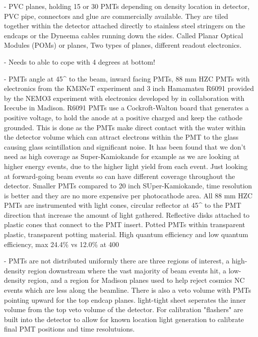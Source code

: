 - PVC planes, holding 15 or 30 PMTs depending on density location in detector, PVC pipe,
connectors and glue are commercially available. They are tiled together within the detector
attached directly to stainless steel stringers on the endcaps or the Dyneema cables running down
the sides. Called Planar Optical Modules (POMs) or planes, Two types of planes, different readout
electronics.

- Needs to able to cope with 4 degrees at bottom!

- PMTs angle at \unit{45}{^\circ} to the beam, inward facing PMTs, 88 mm HZC PMTs with electronics
from the KM3NeT experiment and 3 inch Hamamatsu R6091 provided by the NEMO3 experiment with
electronics developed by \chips in collaboration with Icecube in Madison. R6091 PMTs use a
Cockroft-Walton board that generates a positive voltage, to hold the anode at a positive charged
and keep the cathode grounded. This is done as the PMTs make direct contact with the water within
the detector volume which can attract electrons within the PMT to the glass causing glass
scintillation and significant noise. It has been found that we don't need as high coverage as
Super-Kamiokande for example as we are looking at higher energy events, due to the higher light
yield from each event. Just looking at forward-going beam events so can have different coverage
throughout the detector. Smaller PMTs compared to 20 inch SUper-Kamiokande, time resolution is
better and they are no more expensive per photocathode area. All 88 mm HZC PMTs are instrumented
with light cones, circular reflector at \unit{45}{^\circ} to the PMT direction that increase the
amount of light gathered. Reflective disks attached to plastic cones that connect to the PMT
insert. Potted PMTs within transparent plastic, transparent potting material. High quantum
efficiency and low quantum efficiency, max 24.4\% vs 12.0\% at \unit{400}{}

- PMTs are not distributed uniformly there are three regions of interest, a high-density region
downstream where the vast majority of beam events hit, a low-density region, and a region for
Madison planes used to help reject cosmics NC events which are less along the beamline. There is
also a veto volume with PMTs pointing upward for the top endcap planes. light-tight sheet
seperates the inner volume from the top veto volume of the detector. For calibration "flashers"
are built into the detector to allow for known location light generation to calibrate final PMT
positions and time resolutuions.

